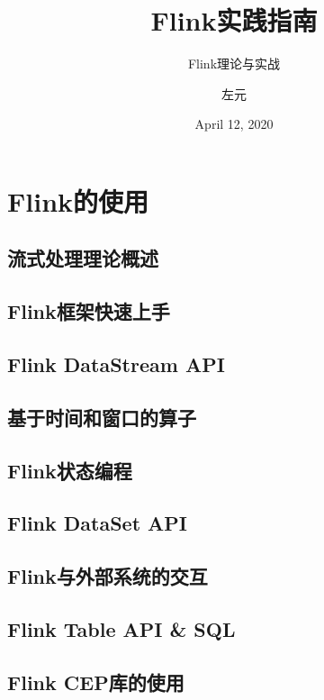 \documentclass[cn,11pt,chinese]{elegantbook}
\title{Flink实践指南}
\subtitle{Flink理论与实战}
\author{左元}
\institute{尚硅谷}
\date{April 12, 2020}
\begin{document}

\maketitle
\frontmatter

\tableofcontents

\mainmatter
\part{Flink的使用}

\chapter{流式处理理论概述}

\chapter{Flink框架快速上手}

\chapter{Flink DataStream API}

\chapter{基于时间和窗口的算子}

\chapter{Flink状态编程}

\chapter{Flink DataSet API}

\chapter{Flink与外部系统的交互}

\chapter{Flink Table API \& SQL}

\chapter{Flink CEP库的使用}
\end{document}
